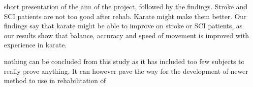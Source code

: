 
short presentation of the aim of the project, followed by the findings. 
Stroke and SCI patients are not too good after rehab. Karate might make them better. Our findings say that karate might be able to improve on stroke or SCI patients, as our results show that balance, accuracy and speed of movement is improved with experience in karate. 

nothing can be concluded from this study as it has included too few subjects to really prove anything. It can however pave the way for the development of newer method to use in rehabilitation of 